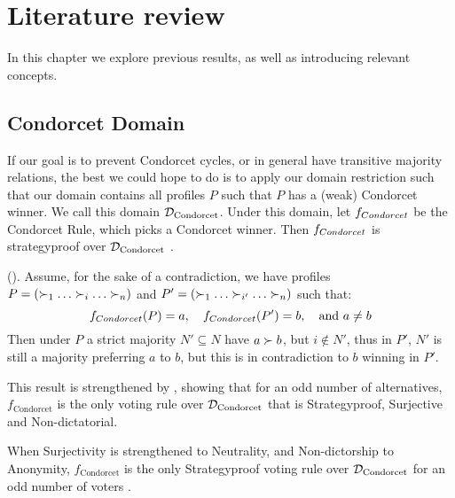 \newpage
\chapter{Literature review}
\label{Literature}


In this chapter we explore previous results, as well as introducing relevant concepts.




\section{Condorcet Domain}
If our goal is to prevent Condorcet cycles, or in general have transitive majority relations, the best we could hope to do is to apply our domain restriction such that our domain contains all profiles $P$ such that $P$ has a (weak) Condorcet winner. We call this domain $\mathcal{D}_{\textnormal{Condorcet}}$. Under this domain, let $f_{\normalfont{Condorcet}}$ be the Condorcet Rule, which picks a Condorcet winner. Then $f_{\normalfont{Condorcet}}$ is strategyproof over $\mathcal{D}_{\textnormal{Condorcet}}$ \citep{elkindPreferenceRestrictionsComputational2022}.

\begin{proofc}{(\citet{elkindPreferenceRestrictionsComputational2022})}.
	Assume, for the sake of a contradiction, we have profiles $P = (\pref_1 \dots \pref_i \dots \pref_n)$ and $P' = (\pref_1 \dots \pref_{i'} \dots \pref_n)$ such that:
	\[
		f_{\normalfont{Condorcet}}(P) = a, \quad f_{\normalfont{Condorcet}}(P') = b, \quad \text{and } a \neq b
	\]
	Then under $P$ a strict majority $N' \subseteq N$ have $a \succ b$, but $i \notin N'$, thus in $P'$, $N'$ is still a majority preferring $a$ to $b$, but this is in contradiction to $b$ winning in $P'$.
\end{proofc}

This result is strengthened by \citet{campbellNonmonotonicityDoesNot2002,campbellCorrectionStrategyproofnessCharacterization2016}, showing that for an odd number of alternatives, \(f_{\text{Condorcet}}\) is the only voting rule over \(\mathcal{D}_{\textnormal{Condorcet}}\) that is Strategyproof, Surjective and Non-dictatorial.

When Surjectivity is strengthened to Neutrality, and Non-dictorship to Anonymity, \linebreak \(f_{\text{Condorcet}}\) is the only Strategyproof voting rule over \(\mathcal{D}_{\textnormal{Condorcet}}\) for an odd number of voters \cite{campbellAnonymousNeutralStrategyproof2015}.

